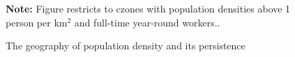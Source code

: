 \begin{figure}[!h]
\centering
\caption{The geography of population density and its persistence}
 \\  \\ 
\par \begin{minipage}[h]{\textwidth}{\scriptsize\textbf{Note:} Figure restricts to czones with population densities above 1 person per km$^2$ and full-time year-round workers..}\end{minipage}
\end{figure}
